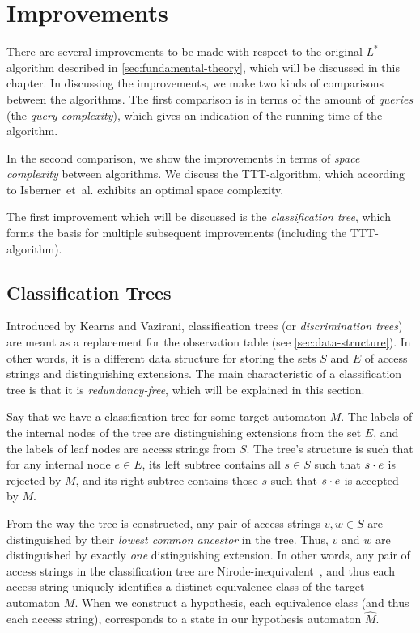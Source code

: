 \documentclass[multi,crop=false,class=article]{standalone}
\begin{document}
\section{Improvements}
\label{sec:improvements}
There are several improvements to be made with respect to the original $L^*$
algorithm described in \cref{sec:fundamental-theory}, which will be discussed in
this chapter. In discussing the improvements, we make two kinds of comparisons
between the algorithms. The first comparison is in terms of the amount of
\textit{queries} (the \textit{query complexity}), which gives an indication of
the running time of the algorithm.

In the second comparison, we show the improvements in terms of \textit{space
  complexity} between algorithms. We discuss the TTT-algorithm, which according
to Isberner~et~al. exhibits an optimal space complexity\cite{Isberner14b}.

The first improvement which will be discussed is the \textit{classification
  tree}, which forms the basis for multiple subsequent improvements (including
the TTT-algorithm).

\subsection{Classification Trees}
\label{sec:classification-trees}
Introduced by Kearns and Vazirani\cite{Kearns94}, classification trees (or
\textit{discrimination trees}) are meant as a replacement for the observation
table (see \cref{sec:data-structure}). In other words, it is a different data
structure for storing the sets $S$ and $E$ of access strings and distinguishing
extensions. The main characteristic of a classification tree is that it is
\textit{redundancy-free}, which will be explained in this section.

Say that we have a classification tree for some target automaton $M$. The labels
of the internal nodes of the tree are distinguishing extensions from the set
$E$, and the labels of leaf nodes are access strings from $S$. The tree's
structure is such that for any internal node $e \in E$, its left subtree
contains all $s \in S$ such that $s \cdot e$ is rejected by $M$, and its right
subtree contains those $s$ such that $s \cdot e$ is accepted by $M$.

From the way the tree is constructed, any pair of access strings $v,w \in S$ are
distinguished by their \textit{lowest common ancestor} in the tree. Thus, $v$
and $w$ are distinguished by exactly \textit{one} distinguishing extension. In
other words, any pair of access strings in the classification tree are
Nirode-inequivalent~, and thus each access
string uniquely identifies a distinct equivalence class of the target automaton
$M$. When we construct a hypothesis, each equivalence class (and thus each
access string), corresponds to a state in our hypothesis automaton $\hat M$.
\end{document}

